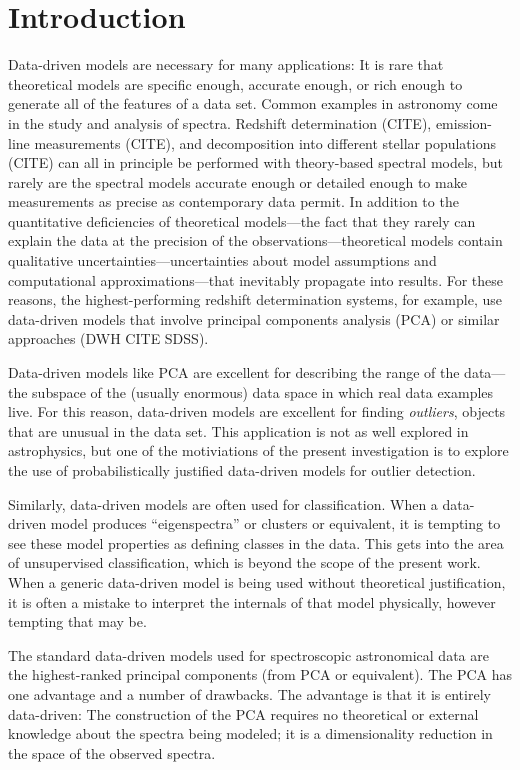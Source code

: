 \documentclass[apj]{emulateapj}
\begin{document}
\section{Introduction}\label{intro}
Data-driven models are necessary for many applications: It is rare
that theoretical models are specific enough, accurate enough, or rich
enough to generate all of the features of a data set.  Common examples
in astronomy come in the study and analysis of spectra.  Redshift
determination (CITE), emission-line measurements (CITE), and
decomposition into different stellar populations (CITE) can all in
principle be performed with theory-based spectral models, but rarely
are the spectral models accurate enough or detailed enough to make
measurements as precise as contemporary data permit.  In addition to
the quantitative deficiencies of theoretical models---the fact that
they rarely can explain the data at the precision of the
observations---theoretical models contain qualitative
uncertainties---uncertainties about model assumptions and
computational approximations---that inevitably propagate into results.
For these reasons, the highest-performing redshift determination
systems, for example, use data-driven models that involve principal
components analysis (PCA) or similar approaches (DWH CITE SDSS).

Data-driven models like PCA are excellent for describing the range of
the data---the subspace of the (usually enormous) data space in which
real data examples live.  For this reason, data-driven models are
excellent for finding \emph{outliers}, objects that are unusual in the
data set.  This application is not as well explored in astrophysics,
but one of the motiviations of the present investigation is to explore
the use of probabilistically justified data-driven models for outlier
detection.

Similarly, data-driven models are often used for classification.  When
a data-driven model produces ``eigenspectra'' or clusters or
equivalent, it is tempting to see these model properties as defining
classes in the data.  This gets into the area of unsupervised
classification, which is beyond the scope of the present work.  When a
generic data-driven model is being used without theoretical
justification, it is often a mistake to interpret the internals of
that model physically, however tempting that may be.

The standard data-driven models used for spectroscopic astronomical
data are the highest-ranked principal components (from PCA or
equivalent). The PCA has one advantage and a number of drawbacks.  The
advantage is that it is entirely data-driven: The construction of the
PCA requires no theoretical or external knowledge about the spectra
being modeled; it is a dimensionality reduction in the space of the
observed spectra.
\end{document}
